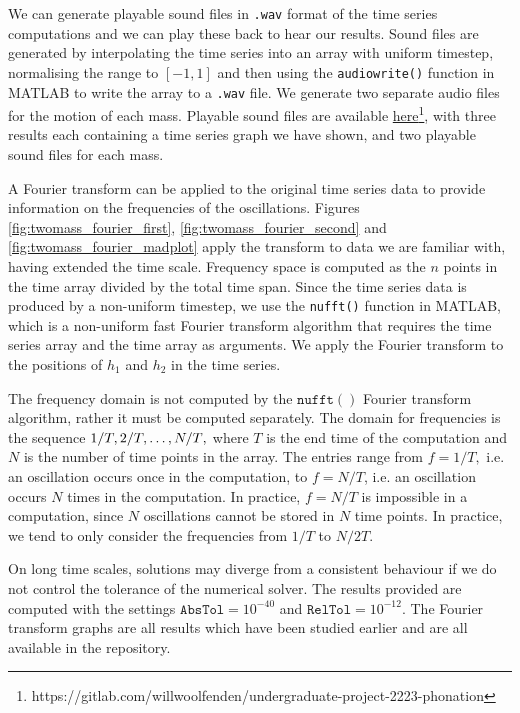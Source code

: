 We can generate playable sound files in \texttt{.wav} format of the time series computations and we can play these back to hear our results.
Sound files are generated by interpolating the time series into an array with uniform timestep,
normalising the range to $[-1,1]$
and then using the \texttt{audiowrite()} function in MATLAB to write the array to a \texttt{.wav} file.
We generate two separate audio files for the motion of each mass.
Playable sound files are available \hyperlink{https://gitlab.com/willwoolfenden/undergraduate-project-2223-phonation}{here}\footnote{https://gitlab.com/willwoolfenden/undergraduate-project-2223-phonation},
with three results each containing a time series graph we have shown,
and two playable sound files for each mass.

A Fourier transform can be applied to the original time series data to provide information on the frequencies of the oscillations.
Figures \ref{fig:twomass_fourier_first},
\ref{fig:twomass_fourier_second} and \ref{fig:twomass_fourier_madplot} apply the transform to data we are familiar with,
having extended the time scale.
Frequency space is computed as the $n$ points in the time array divided by the total time span.
Since the time series data is produced by a non-uniform timestep,
we use the \texttt{nufft()} function in MATLAB,
which is a non-uniform fast Fourier transform algorithm that requires the time series array and the time array as arguments.
We apply the Fourier transform to the positions of $h_1$ and $h_2$ in the time series.

The frequency domain is not computed by the $\mathtt{nufft()}$ Fourier transform algorithm,
rather it must be computed separately.
The domain for frequencies is the sequence ${1/T, 2/T, \mathellipsis, N/T},$
where $T$ is the end time of the computation and $N$ is the number of time points in the array.
The entries range from $f = 1/T,$ i.e. an oscillation occurs once in the computation,
to $f = N/T$, i.e. an oscillation occurs $N$ times in the computation.
In practice, $f=N/T$ is impossible in a computation,
since $N$ oscillations cannot be stored in $N$ time points.
In practice, we tend to only consider the frequencies from $1/T$ to $N/2T$.

On long time scales, solutions may diverge from a consistent behaviour if we do not control the tolerance of the numerical solver.
The results provided are computed with the settings $\mathtt{AbsTol}=10^{-40}$ and $\texttt{RelTol}=10^{-12}$.
The Fourier transform graphs are all results which have been studied earlier and are all available in the repository.

